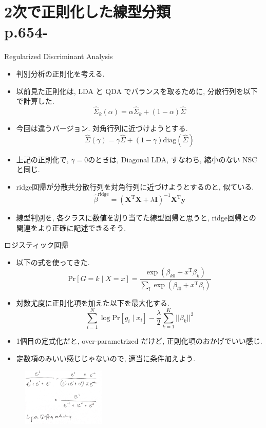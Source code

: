 \documentclass[dvipdfmx,8pt]{beamer}
\newcommand{\probability}[1]{\mathrm{Pr}[{#1}]}
\begin{document}
  \section{2次で正則化した線型分類\\p.654-}
  \begin{frame}{Regularized Discriminant Analysis}
    \begin{itemize}
      \item 判別分析の正則化を考える.
      \item 以前見た正則化は, LDA と QDA でバランスを取るために, 分散行列を以下で計算した.
        \[
          \hat{\Sigma}_k(\alpha)=\alpha\hat{\Sigma}_k+(1-\alpha)\hat{\Sigma}
        \]
      \item 今回は違うバージョン. 対角行列に近づけようとする.
        \[
          \hat{\Sigma}(\gamma)=\gamma\hat{\Sigma}+(1-\gamma)\mathrm{diag}(\hat{\Sigma})
        \]
      \item 上記の正則化で,  $\gamma=0$のときは, Diagonal LDA, すなわち, 縮小のない NSC と同じ.
      \item ridge回帰が分散共分散行列を対角行列に近づけようとするのと, 似ている.
        \[
          \hat{\beta}^{\mathrm{ridge}}=(\textbf{X}^{\mathrm{T}}\textbf{X}+\lambda\textbf{I})^{-1}\textbf{X}^{\mathrm{T}}\textbf{y}
        \]
      \item 線型判別を, 各クラスに数値を割り当てた線型回帰と思うと, ridge回帰との関連をより正確に記述できるそう.
    \end{itemize}
  \end{frame}
  \begin{frame}{ロジスティック回帰}
    \begin{itemize}
      \item 以下の式を使ってきた.
        \[
          \probability{G=k \mid X=x}=\frac{\exp(\beta_{k0}+x^{\mathrm{T}}\beta_k)}{\sum_l\exp(\beta_{l0}+x^{\mathrm{T}}\beta_l)}
        \]
      \item 対数尤度に正則化項を加えた以下を最大化する.
        \[
          \sum_{i=1}^N\log \probability{g_i\mid x_i}-\frac{\lambda}{2}\sum_{k=1}^K||\beta_k||^2
        \]
      \item 1個目の定式化だと, over-parametrized だけど, 正則化項のおかげでいい感じ.
      \item 定数項のみいい感じじゃないので, 適当に条件加えよう.
    \end{itemize}
    \begin{figure}[htb]
      \centering
      \includegraphics[width=4cm]{./images/logistic-redundancy.jpg}
    \end{figure}
  \end{frame}
\end{document}
